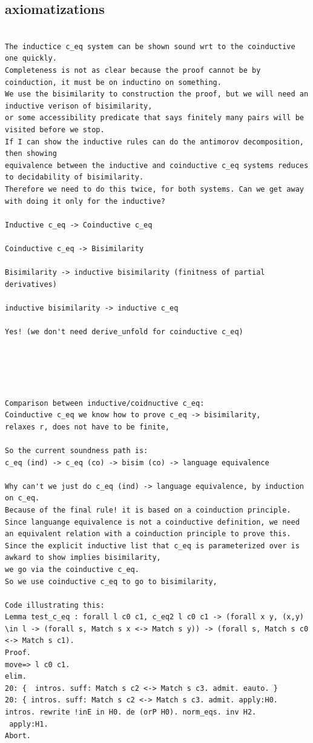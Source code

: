 \subsection{axiomatizations}
\begin{verbatim}

The inductice c_eq system can be shown sound wrt to the coinductive one quickly.
Completeness is not as clear because the proof cannot be by coinduction, it must be on inductino on something.
We use the bisimilarity to construction the proof, but we will need an inductive verison of bisimilarity,
or some accessibility predicate that says finitely many pairs will be visited before we stop.
If I can show the inductive rules can do the antimorov decomposition, then showing 
equivalence between the inductive and coinductive c_eq systems reduces to decidability of bisimilarity.
Therefore we need to do this twice, for both systems. Can we get away with doing it only for the inductive?

Inductive c_eq -> Coinductive c_eq 

Coinductive c_eq -> Bisimilarity

Bisimilarity -> inductive bisimilarity (finitness of partial derivatives)

inductive bisimilarity -> inductive c_eq 

Yes! (we don't need derive_unfold for coinductive c_eq)





Comparison between inductive/coidnuctive c_eq:
Coinductive c_eq we know how to prove c_eq -> bisimilarity,
relaxes r, does not have to be finite,

So the current soundness path is:
c_eq (ind) -> c_eq (co) -> bisim (co) -> language equivalence

Why can't we just do c_eq (ind) -> language equivalence, by induction on c_eq.
Because of the final rule! it is based on a coinduction principle. Since languange equivalence is not a coinductive definition, we need an equivalent relation with a coinduction principle to prove this.
Since the explicit inductive list that c_eq is parameterized over is awkard to show implies bisimilarity,
we go via the coinductive c_eq.
So we use coinductive c_eq to go to bisimilarity,

Code illustrating this:
Lemma test_c_eq : forall l c0 c1, c_eq2 l c0 c1 -> (forall x y, (x,y) \in l -> (forall s, Match s x <-> Match s y)) -> (forall s, Match s c0 <-> Match s c1).
Proof.
move=> l c0 c1.
elim.
20: {  intros. suff: Match s c2 <-> Match s c3. admit. eauto. } 
20: { intros. suff: Match s c2 <-> Match s c3. admit. apply:H0.
intros. rewrite !inE in H0. de (orP H0). norm_eqs. inv H2.
 apply:H1.
Abort.








\end{verbatim}
